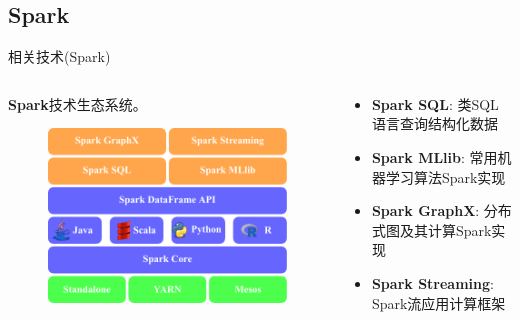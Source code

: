 \subsection{Spark}

\begin{frame}[c]{相关技术(Spark)}
    \begin{columns}
        \begin{column}{0.5 \textwidth}
            \textbf{Spark}技术生态系统。

            \vspace{0.5em}
            \begin{figure}
                \centering
                \includegraphics[scale=0.6]{figures/spark.pdf}
            \end{figure}            
        \end{column}

        
        \pause
        \begin{column}{0.5 \textwidth}
            \begin{itemize}
                \item \textbf{Spark SQL}: 类SQL语言查询结构化数据
                \item \textbf{Spark MLlib}: 常用机器学习算法Spark实现
                \item \textbf{Spark GraphX}: 分布式图及其计算Spark实现
                \item \textbf{Spark Streaming}: Spark流应用计算框架
            \end{itemize}
        \end{column}
    \end{columns}
\end{frame}

